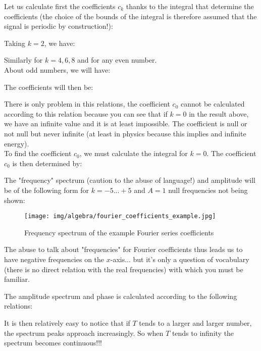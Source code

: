 	\pagebreak
	\begin{tcolorbox}[colframe=black,colback=white,sharp corners]
	Let us calculate first the coefficients $c_k$ thanks to the integral that determine the coefficients (the choice of the bounds of the integral is therefore assumed that the signal is periodic by construction!):
	
	Taking $k = 2$, we have:
	
	Similarly for $k = 4,6,8$ and for any even number.\\
	
	About odd numbers, we will have:
	
	The coefficients will then be:
	
	There is only problem in this relations, the coefficient $c_0$ cannot be calculated according to this relation because you can see that if $k = 0$ in the result above, we have an infinite value and it is at least impossible. The coefficient is null or not null  but never infinite (at least in physics because this implies and infinite energy).\\
	
	To find the coefficient $c_0$, we must calculate the integral for $k = 0$. The coefficient $c_0$ is then determined by:
	
	\end{tcolorbox}
	
	\pagebreak
	\begin{tcolorbox}[colframe=black,colback=white,sharp corners]
	The "frequency" spectrum (caution to the abuse of language!) and amplitude will be of the following form for $k=-5...+5$ and $A=1$ null frequencies not being shown:
	\begin{figure}[H]
		\centering
		\texttt{[image: img/algebra/fourier\_coefficients\_example.jpg]}
		\caption{Frequency spectrum of the example Fourier series coefficients}
	\end{figure}
	\end{tcolorbox}
	The abuse to talk about "frequencies" for Fourier coefficients thus leads us to have negative frequencies on the  $x$-axis... but it's only a question of vocabulary (there is no direct relation with the real frequencies) with which you must be familiar.
	
	The amplitude spectrum and phase is calculated according to the following relations:
	
	It is then relatively easy to notice that if $T$ tends to a larger and larger number, the spectrum peaks approach increasingly. So when $T$ tends to infinity the spectrum becomes continuous!!!
	
